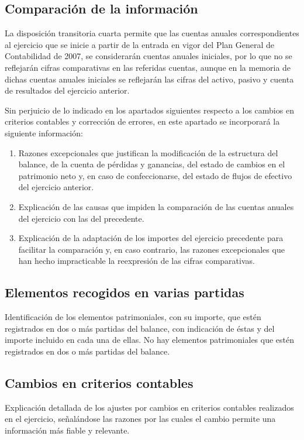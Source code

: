\documentclass[11pt,a4paper]{article}
\begin{document}
  \subsection{Comparación de la información}
La disposición transitoria cuarta permite que las cuentas anuales correspondientes al ejercicio que se inicie a partir de la entrada en vigor del Plan General de Contabilidad de 2007, se considerarán cuentas anuales iniciales, por lo que no se reflejarán cifras comparativas en las referidas cuentas, aunque en la memoria de dichas cuentas anuales iniciales se reflejarán las cifras del activo, pasivo y cuenta de resultados del ejercicio anterior.

Sin perjuicio de lo indicado en los apartados siguientes respecto a los cambios en criterios contables y corrección de errores, en este apartado se incorporará la siguiente información:

\begin{enumerate}
 \item Razones excepcionales que justifican la modificación de la estructura del balance, de la cuenta de pérdidas y ganancias, del estado de cambios en el patrimonio neto y, en caso de confeccionarse, del estado de flujos de efectivo del ejercicio anterior.
 \item Explicación de las causas que impiden la comparación de las cuentas anuales del ejercicio con las del precedente.
 \item Explicación de la adaptación de los importes del ejercicio precedente para facilitar la comparación y, en caso contrario, las razones excepcionales que han hecho impracticable la reexpresión de las cifras comparativas.
\end{enumerate}

  \subsection{Elementos recogidos en varias partidas}
Identificación de los elementos patrimoniales, con su importe, que estén registrados en dos o más partidas del balance, con indicación de éstas y del importe incluido en cada una de ellas.
No hay elementos patrimoniales que estén registrados en dos o más partidas del balance.

  \subsection{Cambios en criterios contables}
Explicación detallada de los ajustes por cambios en criterios contables realizados en el ejercicio, señalándose las razones por las cuales el cambio permite una información más fiable y relevante.
\end{document}
